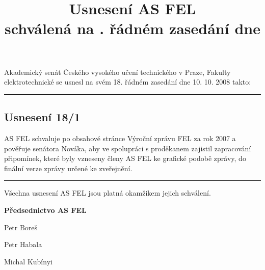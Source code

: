 \documentclass[a4paper,12pt,notitlepage]{article}
\title{Usnesení AS FEL\\schválená na \cislo. řádném zasedání dne \datum}
\author{}\date{}
\newcommand{\cislo}{18}
\newcommand{\datum}{10. 10. 2008 }
\newcommand{\hr}{\bigskip\hrule\bigskip}
\newcommand{\usneseni}[3]{
\subsection*{#1}

#2

}
\begin{document}
\maketitle
\thispagestyle{empty}


Akademický senát Českého vysokého učení technického v Praze, Fakulty
elektrotechnické se usnesl na svém \cislo. řádném zasedání dne \datum takto:\hr

\usneseni{Usnesení \cislo/1}{AS FEL schvaluje po obsahové stránce Výroční zprávu FEL za rok 2007 a pověřuje senátora Nováka, aby ve spolupráci s proděkanem zajistil zapracování připomínek, které byly vzneseny členy AS FEL ke grafické podobě zprávy, do finální verze zprávy určené ke zveřejnění.}




\bigskip\hr
Všechna usnesení AS FEL jsou platná okamžikem jejich schválení.

\bigskip
\begin{center}
\textbf{Předsednictvo AS FEL}

Petr Boreš

Petr Habala

Michal Kubínyi
\end{center}
\end{document}
